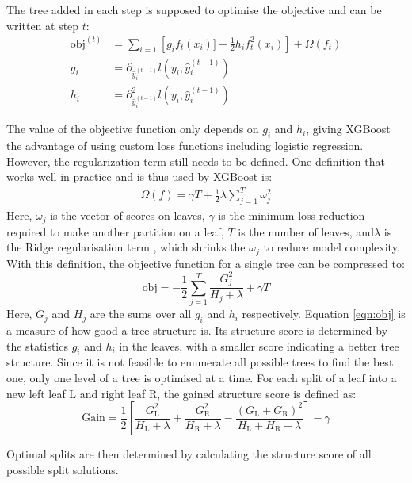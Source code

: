 The tree added in each step is supposed to optimise the objective and can be written at step $t$:
\begin{align}
  \text{obj}^{(t)} &= \sum_{i=1} \left[g_i f_t(x_i)] + \frac{1}{2}h_i f_t^2(x_i)\right] + \Omega(f_t)  \\
  g_i &= \partial_{\hat{y}_i^{(t-1)}} l(y_i, \hat{y}_i^{(t-1)}) \\
  h_i &= \partial^2_{\hat{y}_i^{(t-1)}} l(y_i, \hat{y}_i^{(t-1)})
\end{align}

The value of the objective function only depends on $g_i$ and $h_i$, giving XGBoost the advantage of using custom loss functions including logistic regression.
However, the regularization term still needs to be defined. One definition that works well in practice and is thus used by XGBoost is:
\begin{align}
  \Omega (f) = \gamma T + \frac{1}{2}\lambda \sum_{j=1}^T \omega_j^2
\end{align}
Here, $\omega_j$ is the vector of scores on leaves, $\gamma$ is the minimum loss reduction required to make
another partition on a leaf, $T$ is the number of leaves, and$\lambda$ is the Ridge regularisation term \cite{ridge}, which shrinks the $\omega_j$ to reduce model
complexity. \\
With this definition, the objective function for a single tree can be compressed to:
\begin{equation} \label{eqn:obj}
  \text{obj} = -\frac{1}{2}\sum_{j=1}^T \frac{G_j^2}{H_j + \lambda} + \gamma T
\end{equation}
Here, $G_j$ and $H_j$ are the sums over all $g_i$ and $h_i$ respectively. Equation \ref{eqn:obj} is a measure of how good a tree structure is. Its structure score
is determined by the statistics $g_i$ and $h_i$ in the leaves, with a smaller score indicating a better tree structure.
Since it is not feasible to enumerate all possible trees to find the best one, only one level of a tree is optimised at a time.
For each split of a leaf into a new left leaf L and right leaf R, the gained structure score is defined as:
\begin{equation}
  \text{Gain} = \frac{1}{2}\left[\frac{G_{\text{L}}^2}{H_{\text{L}} + \lambda} + \frac{G_{\text{R}}^2}{H_{\text{R}} + \lambda} - \frac{(G_{\text{L}} + G_{\text{R}})^2}{H_{\text{L}}+H_{\text{R}}+\lambda}\right] -\gamma
\end{equation}

Optimal splits are then determined by calculating the structure score of all possible split solutions.

